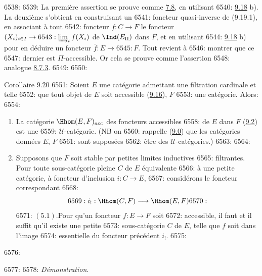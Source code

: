 6538: 
6539: La première assertion se prouve comme \hyperref[I.prop7.8]{7.8}, en utilisant
6540: \hyperref[I.cor9.18]{9.18} b). La deuxième s'obtient en construisant un
6541: foncteur quasi-inverse de (9.19.1), en associant à tout
6542: foncteur $f:C\rightarrow F$ le foncteur $(X_i)_{i\in I}\rightarrow
6543: \varinjlim_i f(X_i)$ de $\Ind(E_{\Pi})$ dans $F$, et en utilisant
6544: \hyperref[I.cor9.18]{9.18} b) pour en déduire un foncteur $\bar{f}:E\rightarrow
6545: F$. Tout revient à %
6546: montrer que ce%
6547: dernier est $\Pi$-accessible. Or cela se prouve comme l'assertion
6548: analogue \hyperref[I.prop8.7.3]{8.7.3}.
6549: 
6550: \begin{enonce*}{Corollaire 9.20}
6551: Soient $E$ une catégorie admettant une filtration cardinale et telle
6552: que tout objet de $E$ soit accessible (\cf \hyperref[I.prop9.16]{9.16}), $F$
6553: une catégorie. Alors:
6554: \begin{enumerate}
6555: \renewcommand{\theenumi}{\alph{enumi}}
6556: \renewcommand{\labelenumi}{\theenumi)}
6557: \item La catégorie $\Hhom(E,F)_{acc}$ des foncteurs accessibles
6558: de $E$ dans $F$ (\hyperref[I.def9.2]{9.2}) est une
6559: $𝒰$-catégorie. ({\rm NB} on
6560: rappelle (\hyperref[I.sec9.0]{9.0}) que les catégories données $E$, $F$
6561: sont supposées
6562: être des $𝒰$-catégories.)
6563: 
6564: \item Supposons que $F$ soit stable par petites limites inductives
6565: filtrantes. Pour toute sous-catégorie pleine $C$ de $E$ équivalente
6566: à une petite catégorie, à foncteur d'inclusion $i:C\rightarrow E$,
6567: considérons le foncteur correspondant
6568: $$
6569: i_{!}:\Hhom(C,F)\longrightarrow \Hhom(E,F)
6570: $$
6571: $(5.1)$.\pageoriginale Pour qu'un foncteur $f:E\rightarrow F$ soit
6572: accessible, il faut et il suffit qu'il existe une petite
6573: sous-catégorie $C$ de $E$, telle que $f$ soit dans l'image
6574: essentielle du foncteur précédent $i_{!}$.
6575: \end{enumerate}
6576: \end{enonce*}
6577: 
6578: \noindent \emph{Démonstration}.
